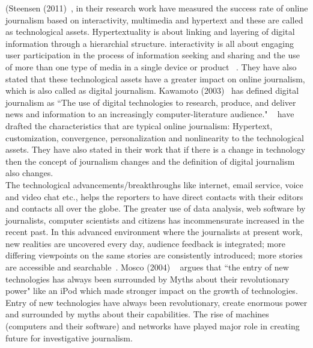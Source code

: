  (Steensen (2011)~\cite{steensen2011online}, in their research work have measured the success rate of online journalism based on interactivity, multimedia and hypertext and these are called as technological assets. Hypertextuality is about linking and layering of digital information through  a hierarchial structure. interactivity is all about engaging user participation in the process of information seeking and sharing and the use of more than one type of media in a single device or product ~\cite{steensen2011online}. They have also stated that these technological assets have a greater impact on online journalism, which is also called as digital journalism. Kawamoto (2003)~\cite{kawamoto2003digital} has defined digital journalism as ``The use of digital technologies to research, produce, and deliver news and information to an increasingly computer-literature audience." ~\cite{kawamoto2003digital} have drafted the characteristics that are typical online journalism: Hypertext, customization, convergence, personalization and nonlinearity to the technological assets. They have also stated in their work that if there is a change in technology then the concept of journalism changes and the definition of digital journalism also changes.\\
 
 The technological advancements/breakthroughs like internet, email service, voice and video chat etc., helps the reporters to have direct contacts with their editors and contacts all over the globe. The greater use of data analysis, web software by journalists, computer scientists and citizens has incommensurate increased in the recent past. In this advanced environment where the journalists at present work, new realities are uncovered every day, audience feedback is integrated; more differing viewpoints on the same stories are consistently introduced; more stories are accessible and searchable~\cite{van2012future}. Mosco (2004) ~\cite{mosco2004digital} argues that ``the entry of new technologies has always been surrounded by Myths about their revolutionary power" like an iPod which made stronger impact on the growth of technologies. Entry of new technologies have always been revolutionary, create enormous power and surrounded by myths about their capabilities.  The rise of machines (computers and their software) and networks have played major role in creating future for investigative journalism.\\
 

